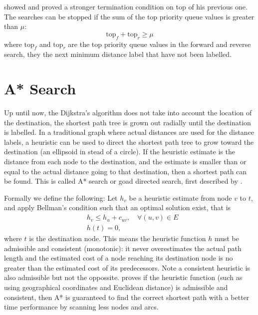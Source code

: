 \citet{GoldbergEPP} showed and proved a stronger termination condition on top of his previous one.
The searches can be stopped if the sum of the top priority queue values is greater than $\mu$:
\[
    \text{top}_f + \text{top}_r \geq \mu
\]
where $\text{top}_f$ and $\text{top}_r$ are the top priority queue values in the forward and reverse search, they the next minimum distance label that have not been labelled.

\section{A* Search}
Up until now,
the Dijkstra's algorithm does not take into account the location of the destination,
the shortest path tree is grown out radially until the destination is labelled.
In a traditional graph where actual distances are used for the distance labels,
a heuristic can be used to direct the shortest path tree to grow toward the destination (an ellipsoid in stead of a circle).
If the heuristic estimate is the distance from each node to the destination,
and the estimate is smaller than or equal to the actual distance going to that destination,
then a shortest path can be found. This is called A* search or goad directed search, first described by \citet{Astar}.

Formally we define the following: Let $h_v$ be a heuristic estimate from node $v$ to $t$,
and apply Bellman's condition such that an optimal solution exist, that is 
\begin{align}
    &h_v \leq h_u + c_{uv}, \quad \forall(u,v) \in E \\
    &h(t) = 0,
\end{align}
where $t$ is the destination node.
This means the heuristic function $h$ must be admissible and consistent (monotonic):
it never overestimates the actual path length and the estimated cost of a node reaching its destination node is no greater than the estimated cost of its predecessors.
Note a consistent heuristic is also admissible but not the oppossite.
\citet{Astar} proves if the heuristic function (such as using geographical coordinates and Euclidean distance) is admissible and consistent,
then A* is guaranteed to find the correct shortest path with a better time performance by scanning less nodes and arcs.

